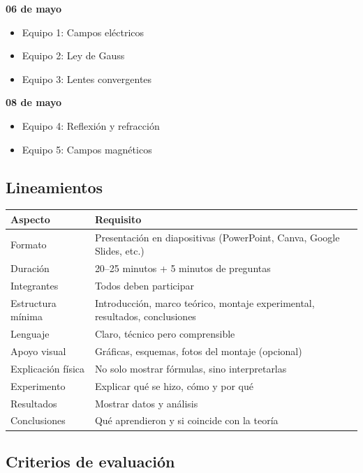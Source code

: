 \textbf{06 de mayo}
\begin{itemize}
    \item Equipo 1: Campos eléctricos
    \item Equipo 2: Ley de Gauss
    \item Equipo 3: Lentes convergentes
\end{itemize}

\textbf{08 de mayo}
\begin{itemize}
    \item Equipo 4: Reflexión y refracción
    \item Equipo 5: Campos magnéticos
\end{itemize}

\subsection{Lineamientos}

\begin{longtable}{|p{5cm}|p{9cm}|}
\hline
\textbf{Aspecto} & \textbf{Requisito} \\
\hline
Formato & Presentación en diapositivas (PowerPoint, Canva, Google Slides, etc.) \\
\hline
Duración & 20--25 minutos + 5 minutos de preguntas \\
\hline
Integrantes & Todos deben participar \\
\hline
Estructura mínima & Introducción, marco teórico, montaje experimental, resultados, conclusiones \\
\hline
Lenguaje & Claro, técnico pero comprensible \\
\hline
Apoyo visual & Gráficas, esquemas, fotos del montaje (opcional) \\
\hline
Explicación física & No solo mostrar fórmulas, sino interpretarlas \\
\hline
Experimento & Explicar qué se hizo, cómo y por qué \\
\hline
Resultados & Mostrar datos y análisis \\
\hline
Conclusiones & Qué aprendieron y si coincide con la teoría \\
\hline
\end{longtable}

\subsection{Criterios de evaluación}

